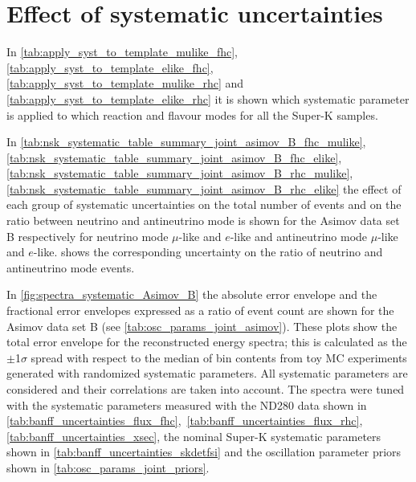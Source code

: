 
%
%

\section{Effect of systematic uncertainties}
\label{app:systematics}

In \cref{tab:apply_syst_to_template_mulike_fhc},
\ref{tab:apply_syst_to_template_elike_fhc},
\ref{tab:apply_syst_to_template_mulike_rhc} and
\ref{tab:apply_syst_to_template_elike_rhc}
it is shown which systematic parameter is applied to which reaction and flavour modes 
for all the Super-K samples.
 
\afterpage{}
\afterpage{}
\afterpage{}
\afterpage{}

\clearpage


In \cref{tab:nsk_systematic_table_summary_joint_asimov_B_fhc_mulike},
\ref{tab:nsk_systematic_table_summary_joint_asimov_B_fhc_elike},
\ref{tab:nsk_systematic_table_summary_joint_asimov_B_rhc_mulike},
\ref{tab:nsk_systematic_table_summary_joint_asimov_B_rhc_elike}
the effect of each group of systematic uncertainties 
on the total number of events and on the ratio 
between neutrino and antineutrino mode is shown for the Asimov data set B
respectively for
neutrino mode $\mu$-like and $e$-like
and 
antineutrino mode $\mu$-like and $e$-like.
shows the corresponding uncertainty on the ratio of 
neutrino and antineutrino mode events.









In \cref{fig:spectra_systematic_Asimov_B} 
the absolute error envelope and the fractional error envelopes expressed as a ratio of event count 
are shown for the Asimov data set B (see \cref{tab:osc_params_joint_asimov}).
These plots show the total error envelope for the reconstructed energy spectra; 
this is calculated
as the $\pm$1$\sigma$ spread with respect to the median of bin contents from \NumToys toy MC experiments generated with 
randomized systematic parameters.
All systematic parameters are considered and their correlations are taken into account.
The spectra were tuned with the systematic parameters measured with the ND280 data 
shown in \cref{tab:banff_uncertainties_flux_fhc},~\ref{tab:banff_uncertainties_flux_rhc}, 
\ref{tab:banff_uncertainties_xsec},
the nominal Super-K systematic parameters shown in \cref{tab:banff_uncertainties_skdetfsi}
and the oscillation parameter priors shown in \cref{tab:osc_params_joint_priors}.


